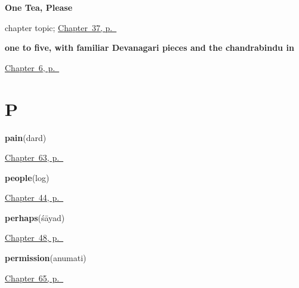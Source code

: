 \noindent\begin{minipage}[t]{\linewidth}
\raggedright
\textbf{One Tea, Please}\par
\footnotesize chapter topic; \hyperref[ch:hi-one-tea-please]{Chapter~37, p.~\pageref*{ch:hi-one-tea-please}}
\end{minipage}\par\smallskip

\noindent\begin{minipage}[t]{\linewidth}
\raggedright
\textbf{one to five, with familiar Devanagari pieces and the chandrabindu in }\enspace\emph{    }\par
\footnotesize \hyperref[ch:hi-numbers-1-5]{Chapter~6, p.~\pageref*{ch:hi-numbers-1-5}}
\end{minipage}\par\smallskip

\section*{P}

\noindent\begin{minipage}[t]{\linewidth}
\raggedright
\textbf{pain}\enspace\emph{}\enspace(dard)\par
\footnotesize \hyperref[ch:hi-what-the-body-tells-you]{Chapter~63, p.~\pageref*{ch:hi-what-the-body-tells-you}}
\end{minipage}\par\smallskip

\noindent\begin{minipage}[t]{\linewidth}
\raggedright
\textbf{people}\enspace\emph{}\enspace(log)\par
\footnotesize \hyperref[ch:hi-sons-daughters]{Chapter~44, p.~\pageref*{ch:hi-sons-daughters}}
\end{minipage}\par\smallskip

\noindent\begin{minipage}[t]{\linewidth}
\raggedright
\textbf{perhaps}\enspace\emph{}\enspace(śāyad)\par
\footnotesize \hyperref[ch:hi-replies]{Chapter~48, p.~\pageref*{ch:hi-replies}}
\end{minipage}\par\smallskip

\noindent\begin{minipage}[t]{\linewidth}
\raggedright
\textbf{permission}\enspace\emph{}\enspace(anumati)\par
\footnotesize \hyperref[ch:hi-asking-nicely]{Chapter~65, p.~\pageref*{ch:hi-asking-nicely}}
\end{minipage}\par\smallskip

